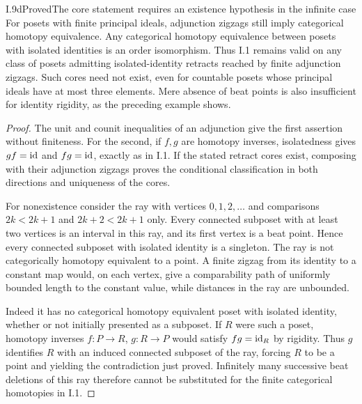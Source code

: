 \begin{claim}{I.9d}{Proved}{The core statement requires an existence hypothesis in the infinite case}
For posets with finite principal ideals, adjunction zigzags still
imply categorical homotopy equivalence. Any categorical homotopy
equivalence between posets with isolated identities is an order
isomorphism. Thus I.1 remains valid on any class of posets admitting
isolated-identity retracts reached by finite adjunction zigzags.
Such cores need not exist, even for countable posets whose principal
ideals have at most three elements. Mere absence of beat points is
also insufficient for identity rigidity, as the preceding example
shows.
\end{claim}
\begin{proof}
The unit and counit inequalities of an adjunction give the first
assertion without finiteness. For the second, if $f,g$ are homotopy
inverses, isolatedness gives $gf=\mathrm{id}$ and $fg=\mathrm{id}$, exactly as in
I.1. If the stated retract cores exist, composing with their
adjunction zigzags proves the conditional classification in both
directions and uniqueness of the cores.

For nonexistence consider the ray with vertices $0,1,2,\ldots$
and comparisons $2k<2k+1$ and $2k+2<2k+1$ only. Every connected
subposet with at least two vertices is an interval in this ray, and
its first vertex is a beat point. Hence every connected subposet
with isolated identity is a singleton. The ray is not categorically
homotopy equivalent to a point. A finite zigzag from its identity
to a constant map would, on each vertex, give a comparability path
of uniformly bounded length to the constant value, while distances
in the ray are unbounded.

Indeed it has no categorical homotopy equivalent poset with isolated
identity, whether or not initially presented as a subposet. If $R$
were such a poset, homotopy inverses $f:P\to R$, $g:R\to P$
would satisfy $fg=\mathrm{id}_R$ by rigidity. Thus $g$ identifies $R$
with an induced connected subposet of the ray, forcing $R$ to be
a point and yielding the contradiction just proved. Infinitely many
successive beat deletions of this ray therefore cannot be substituted
for the finite categorical homotopies in I.1.
\end{proof}
